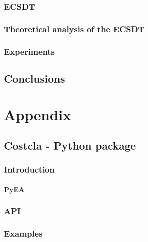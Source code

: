 \documentclass[twoside,openright,titlepage,numbers=noenddot,headinclude,%
               footinclude=true,cleardoublepage=empty,abstractoff,BCOR=5mm,%
               paper=a4,fontsize=12pt,ngerman,american]{scrreprt}
\numberwithin{theorem}{chapter}
\numberwithin{definition}{chapter}
\numberwithin{algorithm}{chapter}
\numberwithin{figure}{chapter}
\numberwithin{table}{chapter}
\numberwithin{equation}{chapter}
\begin{document}
		\section{ECSDT}
		\section{Theoretical analysis of the ECSDT}
		\section{Experiments}
			
 
\cleardoublepage
\makeatletter
\def\toclevel@chapter{-1}
\makeatother
\chapter{Conclusions}

\appendix
\cleardoublepage
\part{Appendix}
	\chapter{Costcla - Python package}
		\section{Introduction}
			\subsection{PyEA}
		\section{API}
		\section{Examples}

\cleardoublepage
\cleardoublepage
\end{document}
